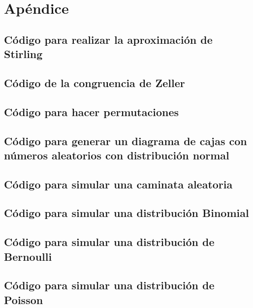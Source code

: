 \section{Apéndice}

\subsection{Código para realizar la aproximación de Stirling}


\pagebreak
\subsection{Código de la congruencia de Zeller} \label{sec:zeller}


\pagebreak
\subsection{Código para hacer permutaciones}


\pagebreak
\subsection{Código para generar un diagrama de cajas con números aleatorios con distribución normal}


\pagebreak
\subsection{Código para simular una caminata aleatoria}


\pagebreak
\subsection{Código para simular una distribución Binomial}


\pagebreak
\subsection{Código para simular una distribución de Bernoulli}


\pagebreak
\subsection{Código para simular una distribución de Poisson}


